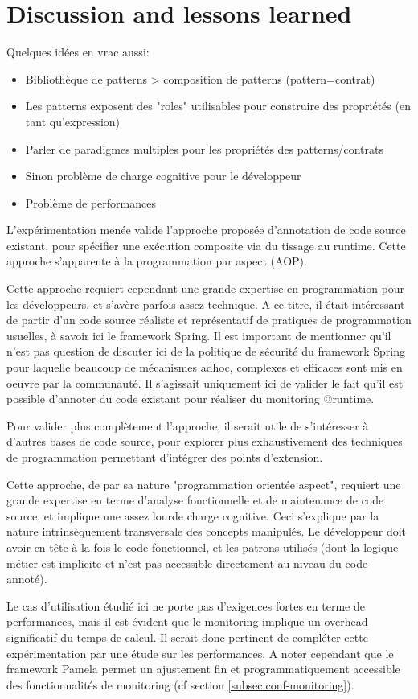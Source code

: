 \section{Discussion and lessons learned}
\label{sec:discussion-lessons-learned}

Quelques idées en vrac aussi:

\begin{itemize}
    \item Bibliothèque de patterns > composition de patterns (pattern=contrat)
    \item Les patterns exposent des "roles" utilisables pour construire des propriétés (en tant qu'expression)
    \item Parler de paradigmes multiples pour les propriétés des patterns/contrats
    \item Sinon problème de charge cognitive pour le développeur
    \item Problème de performances
\end{itemize}

L'expérimentation menée valide l'approche proposée d'annotation de code source existant, pour spécifier une exécution composite via du tissage au runtime. Cette approche s'apparente à la programmation par aspect (AOP).

Cette approche requiert cependant une grande expertise en programmation pour les développeurs, et s'avère parfois assez technique. A ce titre, il était intéressant de partir d'un code source réaliste et représentatif de pratiques de programmation usuelles, à savoir ici le framework Spring. Il est important de mentionner qu'il n'est pas question de discuter ici de la politique de sécurité du framework Spring pour laquelle beaucoup de mécanismes adhoc, complexes et efficaces sont mis en oeuvre par la communauté. Il s'agissait uniquement ici de valider le fait qu'il est possible d'annoter du code existant pour réaliser du monitoring @runtime.

Pour valider plus complètement l'approche, il serait utile de s'intéresser à d'autres bases de code source, pour explorer plus exhaustivement des techniques de programmation permettant d'intégrer des points d'extension. 

Cette approche, de par sa nature "programmation orientée aspect", requiert une grande expertise en terme d'analyse fonctionnelle et de maintenance de code source, et implique une assez lourde charge cognitive. Ceci s'explique par la nature intrinsèquement transversale des concepts manipulés. Le développeur doit avoir en tête à la fois le code fonctionnel, et les patrons utilisés (dont la logique métier est implicite et n'est pas accessible directement au niveau du code annoté).

Le cas d'utilisation étudié ici ne porte pas d'exigences fortes en terme de performances, mais il est évident que le monitoring implique un overhead significatif du temps de calcul. Il serait donc pertinent de compléter cette expérimentation par une étude sur les performances. A noter cependant que le framework Pamela permet un ajustement fin et programmatiquement accessible des fonctionnalités de monitoring (cf section \ref{subsec:conf-monitoring}).
